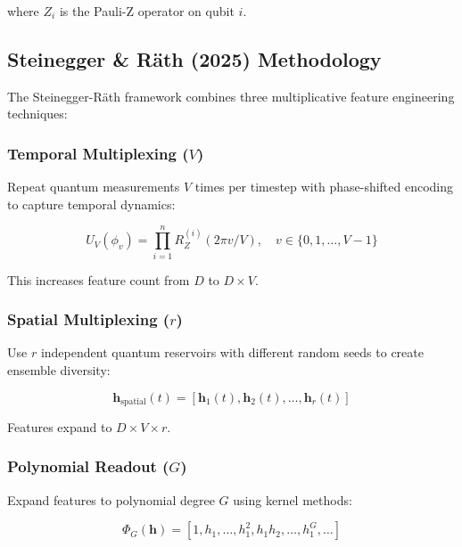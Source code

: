 \documentclass[conference]{IEEEtran}
\begin{document}
where $Z_i$ is the Pauli-Z operator on qubit $i$.

\subsection{Steinegger \& Räth (2025) Methodology}
\label{sec:steinegger_method}

The Steinegger-Räth framework \cite{steinegger2025quantum} combines three multiplicative feature engineering techniques:

\subsubsection{Temporal Multiplexing ($V$)}

Repeat quantum measurements $V$ times per timestep with phase-shifted encoding to capture temporal dynamics:

\begin{equation}
U_V(\phi_v) = \prod_{i=1}^{n} R_Z^{(i)}(2\pi v/V), \quad v \in \{0,1,\ldots,V-1\}
\label{eq:temporal_multiplexing}
\end{equation}

This increases feature count from $D$ to $D \times V$.

\subsubsection{Spatial Multiplexing ($r$)}

Use $r$ independent quantum reservoirs with different random seeds to create ensemble diversity:

\begin{equation}
\mathbf{h}_{\text{spatial}}(t) = [\mathbf{h}_1(t), \mathbf{h}_2(t), \ldots, \mathbf{h}_r(t)]
\label{eq:spatial_multiplexing}
\end{equation}

Features expand to $D \times V \times r$.

\subsubsection{Polynomial Readout ($G$)}

Expand features to polynomial degree $G$ using kernel methods:

\begin{equation}
\Phi_G(\mathbf{h}) = [1, h_1, \ldots, h_1^2, h_1 h_2, \ldots, h_1^G, \ldots]
\label{eq:polynomial_expansion}
\end{equation}
\end{document}
